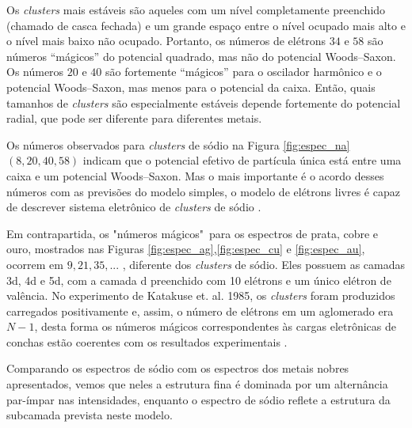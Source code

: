 Os \textit{clusters} mais estáveis são aqueles com um nível completamente preenchido (chamado de casca fechada) e um grande espaço entre o nível ocupado mais alto e o nível mais baixo não ocupado. Portanto, os números de elétrons $34$ e $58$ são números “mágicos” do potencial quadrado, mas não do potencial Woods–Saxon. Os números $20$ e $40$ são fortemente “mágicos” para o oscilador harmônico e o potencial Woods–Saxon, mas menos para o potencial da caixa. Então, quais tamanhos de \textit{clusters} são especialmente estáveis depende fortemente do potencial radial, que pode ser diferente para diferentes metais.
 
Os números observados para 
\textit{clusters} de sódio na Figura \ref{fig:espec_na} $(8, 20, 40, 58)$ indicam que o potencial efetivo de partícula única está entre uma caixa e um potencial Woods–Saxon. Mas o mais importante é o acordo desses números com as previsões do modelo simples, o modelo de elétrons livres é capaz de descrever sistema eletrônico de \textit{clusters} de sódio \cite{livro_Clusters_Fullerenes}.



Em contrapartida, os "números mágicos"\ para os espectros de prata, cobre e ouro, mostrados nas Figuras \ref{fig:espec_ag},\ref{fig:espec_cu} e \ref{fig:espec_au}, ocorrem em
$9, 21, 35,...$ , diferente dos \textit{clusters} de sódio. Eles possuem as camadas 3d, 4d e 5d, com a camada d preenchido com 10 elétrons e um único elétron de valência. No experimento de Katakuse et. al. 1985,  os \textit{clusters} foram produzidos carregados positivamente e, assim, o número de elétrons em um aglomerado era $N - 1$, desta forma os números mágicos correspondentes às cargas eletrônicas de conchas estão coerentes com os resultados experimentais \cite{Heer}.

Comparando os espectros de sódio com os espectros dos metais nobres apresentados, vemos que neles a estrutura fina é dominada por um alternância par-ímpar nas intensidades, enquanto o espectro de sódio reflete a estrutura da subcamada prevista neste modelo. 




